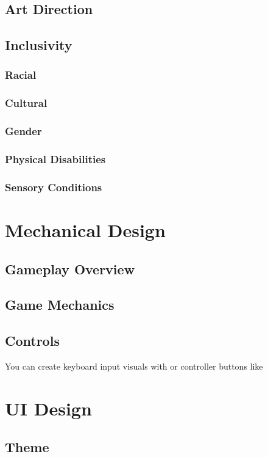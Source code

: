 \subsection{Art Direction}
\subsection{Inclusivity}
\subsubsection{Racial}
\subsubsection{Cultural}
\subsubsection{Gender}
\subsubsection{Physical Disabilities}
\subsubsection{Sensory Conditions}

\section{Mechanical Design}
\subsection{Gameplay Overview}
\subsection{Game Mechanics}
\subsection{Controls}

You can create keyboard input visuals with  or controller buttons like 

\section{UI Design}
\subsection{Theme}
